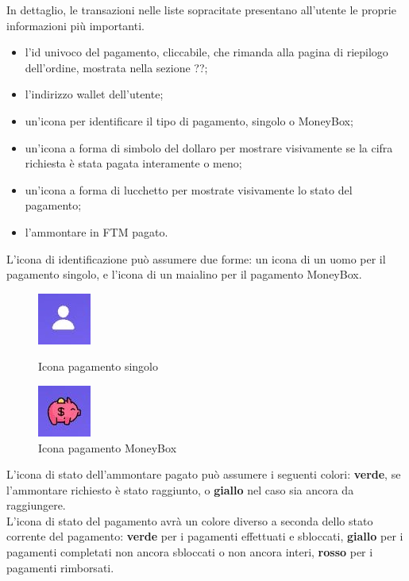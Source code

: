In dettaglio, le transazioni nelle liste sopracitate presentano all'utente le proprie informazioni più importanti.

\begin{itemize}
    \item l'id univoco del pagamento, cliccabile, che rimanda alla pagina di riepilogo dell'ordine, mostrata nella sezione ??;
    \item l'indirizzo wallet dell'utente;
    \item un'icona per identificare il tipo di pagamento, singolo o MoneyBox;
    \item un'icona a forma di simbolo del dollaro per mostrare visivamente se la cifra richiesta è stata pagata interamente o meno;
    \item un'icona a forma di lucchetto per mostrate visivamente lo stato del pagamento;
    \item l'ammontare in FTM pagato.
\end{itemize}

L'icona di identificazione può assumere due forme: un icona di un uomo per il pagamento singolo, e l'icona di un maialino per il pagamento MoneyBox.

\begin{figure}[H]
    \centering
    \begin{minipage}{0.45\textwidth}
        \centering
        \includegraphics[scale=1]{immagini/uomo.jpg} 
        \caption{Icona pagamento singolo}
    \end{minipage}\hfill
    \begin{minipage}{0.45\textwidth}
        \centering
        \includegraphics[scale=1]{immagini/piggy.jpg} 
        \caption{Icona pagamento MoneyBox}
    \end{minipage}
\end{figure}

L'icona di stato dell'ammontare pagato può assumere i seguenti colori: \textbf{verde}, se l'ammontare richiesto è stato raggiunto, o \textbf{giallo} nel caso sia ancora da raggiungere.\\

L'icona di stato del pagamento avrà un colore diverso a seconda dello stato corrente del pagamento: \textbf{verde} per i pagamenti effettuati e sbloccati, 
\textbf{giallo} per i pagamenti completati non ancora sbloccati o non ancora interi, \textbf{rosso} per i pagamenti rimborsati.

